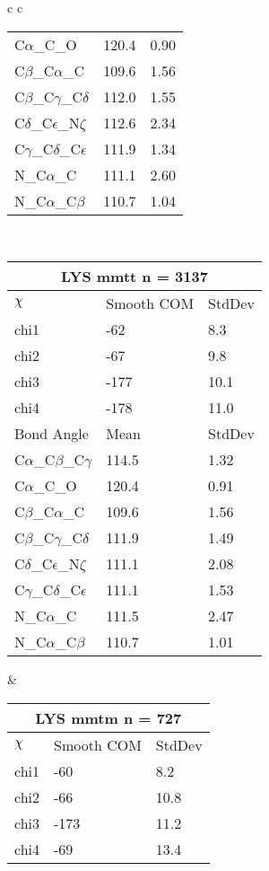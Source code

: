 \begin{longtable}{ c c }
\begin{tabular}{ l l l }
  C$\alpha$\_C\_O & 120.4 & 0.90\\
  C$\beta$\_C$\alpha$\_C & 109.6 & 1.56\\
  C$\beta$\_C$\gamma$\_C$\delta$ & 112.0 & 1.55\\
  C$\delta$\_C$\epsilon$\_N$\zeta$ & 112.6 & 2.34\\
  C$\gamma$\_C$\delta$\_C$\epsilon$ & 111.9 & 1.34\\
  N\_C$\alpha$\_C & 111.1 & 2.60\\
  N\_C$\alpha$\_C$\beta$ & 110.7 & 1.04\\
  \bottomrule
  \end{tabular}
  \\
  \begin{tabular}{ l l l }
  \toprule
  \multicolumn{3}{c}{LYS \textbf{mmtt} n = 3137} \\ \toprule
  $\chi$       & Smooth COM & StdDev \\ \midrule
  chi1 & -62 & 8.3 \\ 
  chi2 & -67 & 9.8 \\ 
  chi3 & -177 & 10.1 \\ 
  chi4 & -178 & 11.0 \\ \midrule
  Bond Angle   & Mean     & StdDev \\ \midrule
  C$\alpha$\_C$\beta$\_C$\gamma$ & 114.5 & 1.32\\
  C$\alpha$\_C\_O & 120.4 & 0.91\\
  C$\beta$\_C$\alpha$\_C & 109.6 & 1.56\\
  C$\beta$\_C$\gamma$\_C$\delta$ & 111.9 & 1.49\\
  C$\delta$\_C$\epsilon$\_N$\zeta$ & 111.1 & 2.08\\
  C$\gamma$\_C$\delta$\_C$\epsilon$ & 111.1 & 1.53\\
  N\_C$\alpha$\_C & 111.5 & 2.47\\
  N\_C$\alpha$\_C$\beta$ & 110.7 & 1.01\\
  \bottomrule
  \end{tabular}
  &
  \begin{tabular}{ l l l }
  \toprule
  \multicolumn{3}{c}{LYS \textbf{mmtm} n = 727} \\ \toprule
  $\chi$       & Smooth COM & StdDev \\ \midrule
  chi1 & -60 & 8.2 \\ 
  chi2 & -66 & 10.8 \\ 
  chi3 & -173 & 11.2 \\ 
  chi4 & -69 & 13.4 \\ \midrule

\end{tabular}
\end{longtable}
